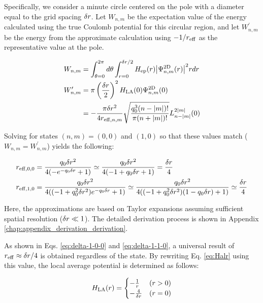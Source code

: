 \documentclass[report_2025.tex]{subfiles}
\begin{document}
Specifically, we consider a minute circle centered on the pole with a diameter
equal to the grid spacing $\delta r$. Let $W_{n,m}$ be the expectation value of
the energy calculated using the true Coulomb potential for this circular region,
and let $W_{n,m}^\prime$ be the energy from the approximate calculation using
$-1/r_{\mathrm{eff}}$ as the representative value at the pole.

\begin{align}
    W_{n,m}&=\int_{\theta=0}^{2\pi}d\theta\int_{r=0}^{\delta r/2}
    H_{\mathrm{ep}}(r){\left| \Psi^{\mathrm{2D}}_{n,m}(r) \right|}^2r dr\\
    W_{n,m}^\prime&=\pi\left(\frac{\delta r}{2}\right)^2
    H_{\mathrm{LA}}(0)\Psi^{\mathrm{2D}}_{n,m}(0) \notag \\
    &=-\frac{\pi\delta r^2}{4r_{\mathrm{eff},n,m}}
    \sqrt{\frac{q_0^3(n-{\left| m \right|})!}{\pi(n+{\left| m \right|})!}}
    L_{n-{\left| m \right|}}^{2{\left| m \right|}}(0)
\end{align}

Solving for states $(n,m)=(0,0)$ and $(1,0)$ so that these values match
($W_{n,m}=W_{n,m}^\prime$) yields the following:

\begin{align}
    r_{\mathrm{eff},0,0} &=\frac{q_0\delta r^2}{4(-e^{-q_0\delta r}+1)}
    \simeq \frac{q_0\delta r^2}{4(-1+q_0\delta r+1)}=\frac{\delta r}{4}
    \label{eq:delta-1-0-0}\\
    r_{\mathrm{eff},1,0} &=\frac{q_0\delta r^2}{4((-1+q_0^2\delta r^2)e^{-q_0\delta r}+1)}
    \simeq \frac{q_0\delta r^2}{4((-1+q_0^2\delta r^2)(1-q_0\delta r)+1)}
    \simeq\frac{\delta r}{4}
    \label{eq:delta-1-1-0}
\end{align}

Here, the approximations are based on Taylor expansions assuming sufficient
spatial resolution ($\delta r \ll 1$). The detailed derivation process is shown
in Appendix \ref{chap:appendix_derivation_derivation}.

As shown in Eqs. \eqref{eq:delta-1-0-0} and \eqref{eq:delta-1-1-0}, a universal
result of $r_{\mathrm{eff}} \approx \delta r/4$ is obtained regardless of the state. By
rewriting Eq. \eqref{eq:Halr} using this value, the local average potential is
determined as follows:

\begin{equation}
H_{\mathrm{LA}}(r) = \begin{cases}
-\frac{1}{r} & (r>0) \\
-\frac{4}{\delta r} & (r=0)
\end{cases}
\label{eq:Hlar2d-fixed}
\end{equation}
\end{document}

